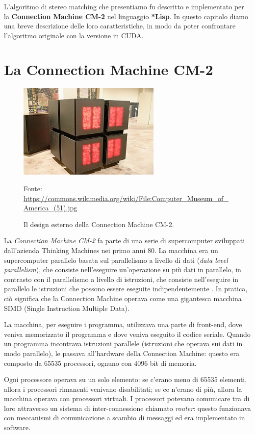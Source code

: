 \documentclass[12pt,a4paper,openright,twoside]{report}
\newcommand{\source}[1]{\caption*{\hfill \scriptsize Fonte: {#1}} }
\begin{document}
L'algoritmo di stereo matching che presentiamo fu descritto e implementato per la \textbf{Connection Machine CM-2} nel linguaggio \textbf{*Lisp}. In questo capitolo diamo una breve descrizione delle loro caratteristiche, in modo da poter confrontare l'algoritmo originale con la versione in CUDA.

\section{La Connection Machine CM-2}

\begin{figure}[h]
    \centering
    \includegraphics[width=7cm]{connection-machine.jpg}
    \source{\url{https://commons.wikimedia.org/wiki/File:Computer_Museum_of_America_(51).jpg}}
    \caption{Il design esterno della Connection Machine CM-2.}
    \label{img:connection_machine}
\end{figure}

La \textit{Connection Machine CM-2} fa parte di una serie di supercomputer sviluppati dall'azienda Thinking Machines nei primo anni 80. La macchina era un supercomputer parallelo basata sul parallelismo a livello di dati (\textit{data level parallelism}), che consiste nell'eseguire un'operazione su più dati in parallelo, in contrasto con il parallelismo a livello di istruzioni, che consiste nell'eseguire in parallelo le istruzioni che possono essere eseguite indipendentemente \cite{originalalgo}. In pratica, ciò significa che la Connection Machine operava come una gigantesca macchina SIMD (Single Instruction Multiple Data).

La macchina, per eseguire i programma, utilizzava una parte di front-end, dove veniva memorizzato il programma e dove veniva eseguito il codice seriale. Quando un programma incontrava istruzioni parallele (istruzioni che operava sui dati in modo parallelo), le passava all'hardware della Connection Machine: questo era composto da 65535 processori, ognuno con 4096 bit di memoria.

Ogni processore operava su un solo elemento: se c'erano meno di 65535 elementi, allora i processori rimanenti venivano disabilitati; se ce n'erano di più, allora la macchina operava con processori virtuali. I processori potevano comunicare tra di loro attraverso un sistema di inter-connessione chiamato \textit{router}: questo funzionava con meccanismi di comunicazione a scambio di messaggi ed era implementato in software.
\end{document}
